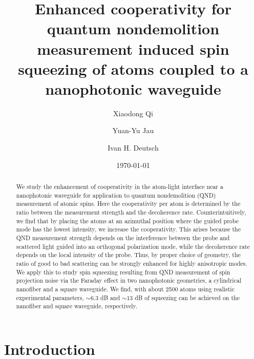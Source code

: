 \documentclass[preprint,aps,pra,onecolumn,superscriptaddress]{revtex4-1} %
\begin{document}
\title{Enhanced cooperativity for quantum nondemolition measurement induced spin squeezing of atoms coupled to a nanophotonic waveguide}
\author{Xiaodong Qi}
\author{Yuan-Yu Jau}
\author{Ivan H. Deutsch}
\date{\today}

\begin{abstract}
We study the enhancement of cooperativity in the atom-light interface near a nanophotonic waveguide for application to quantum nondemolition (QND) measurement of atomic spins.  Here the cooperativity per atom is determined by the ratio between the  measurement strength and the decoherence rate.  Counterintuitively, we find that by placing the atoms at an azimuthal position where the guided probe mode has the lowest intensity, we increase the cooperativity.  This arises because the QND measurement strength depends on the interference between the probe and scattered light guided into an orthogonal polarization mode, while the decoherence rate depends on the local intensity of the probe.  Thus, by proper choice of geometry, the ratio of good to bad scattering can be strongly enhanced for highly anisotropic modes. We apply this to study spin squeezing resulting from QND measurement of spin projection noise via the Faraday effect in two nanophotonic geometries, a cylindrical nanofiber and a square waveguide.  We find, with about 2500 atoms using realistic experimental parameters, $ \sim 6.3 $ dB and $ \sim 13 $ dB of squeezing can be achieved on the nanofiber and square waveguide, respectively. 
\end{abstract}

\maketitle

\section{Introduction}
\end{document}
